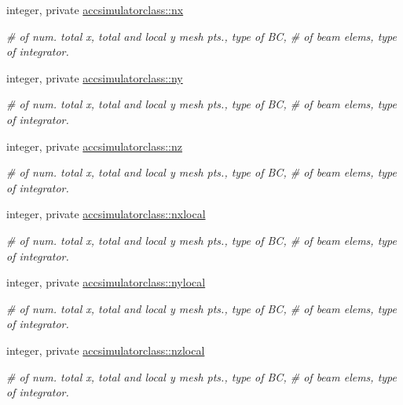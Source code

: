 \textbf{ }\par
\begin{DoxyCompactItemize}
\item 
integer, private \mbox{\hyperlink{namespaceaccsimulatorclass_af61920248f0078da76332ba7c03691f2}{accsimulatorclass\+::nx}}
\begin{DoxyCompactList}\small\item\em \# of num. total x, total and local y mesh pts., type of BC, \# of beam elems, type of integrator. \end{DoxyCompactList}\item 
integer, private \mbox{\hyperlink{namespaceaccsimulatorclass_a51134373ee457cfeffdc9a5041a4d01c}{accsimulatorclass\+::ny}}
\begin{DoxyCompactList}\small\item\em \# of num. total x, total and local y mesh pts., type of BC, \# of beam elems, type of integrator. \end{DoxyCompactList}\item 
integer, private \mbox{\hyperlink{namespaceaccsimulatorclass_a56a2e4504ed5d475f38307ecc7360ede}{accsimulatorclass\+::nz}}
\begin{DoxyCompactList}\small\item\em \# of num. total x, total and local y mesh pts., type of BC, \# of beam elems, type of integrator. \end{DoxyCompactList}\item 
integer, private \mbox{\hyperlink{namespaceaccsimulatorclass_a7f23c64ad80c114ef62069aaede70561}{accsimulatorclass\+::nxlocal}}
\begin{DoxyCompactList}\small\item\em \# of num. total x, total and local y mesh pts., type of BC, \# of beam elems, type of integrator. \end{DoxyCompactList}\item 
integer, private \mbox{\hyperlink{namespaceaccsimulatorclass_a48f766f48eeb1fb22aeff17c6c81e776}{accsimulatorclass\+::nylocal}}
\begin{DoxyCompactList}\small\item\em \# of num. total x, total and local y mesh pts., type of BC, \# of beam elems, type of integrator. \end{DoxyCompactList}\item 
integer, private \mbox{\hyperlink{namespaceaccsimulatorclass_af547860c8c8685ee94f4cca4da117acc}{accsimulatorclass\+::nzlocal}}
\begin{DoxyCompactList}\small\item\em \# of num. total x, total and local y mesh pts., type of BC, \# of beam elems, type of integrator. \end{DoxyCompactList}\item 

\end{DoxyCompactItemize}
